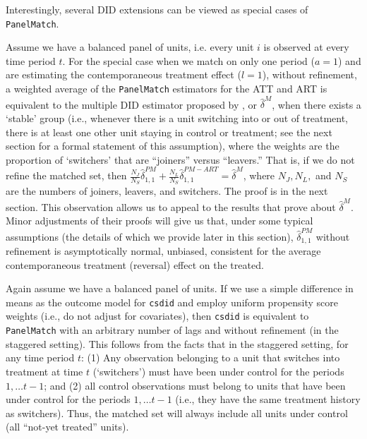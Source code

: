 \documentclass[12pt]{article}
\begin{document}
Interestingly, several DID extensions can be viewed as special cases of \texttt{PanelMatch}.

\begin{rem}
Assume we have a balanced panel of units, i.e. every unit $i$ is observed at every time period $t$. 
For the special case when we match on only one period ($a=1$) and are estimating the contemporaneous treatment effect ($l=1$), without refinement, a weighted average of the \texttt{PanelMatch} estimators for the ATT and ART is equivalent to the multiple DID estimator proposed by \citet{CDH2020}, or $\hat\delta^M$, when there exists a `stable' group (i.e., whenever there is a unit switching into or out of treatment, there is at least one other unit staying in control or treatment; see the next section for a formal statement of this assumption), where the weights are the proportion of `switchers' that are ``joiners'' versus ``leavers.'' That is, if we do not refine the matched set, then $\frac{N_J}{N_S}\hat\delta^{PM}_{1,1}+\frac{N_L}{N_S}\hat\delta^{PM-ART}_{1,1}=\hat\delta^M$, where $N_J,N_L,$ and $N_S$ are the numbers of joiners, leavers, and switchers. 
The proof is in the next section. 
This observation allows us to appeal to the results that \citet{CDH2020} prove about $\hat\delta^M$. Minor adjustments of their proofs will give us that, under some typical assumptions (the details of which we provide later in this section), $\hat\delta_{1,1}^{PM}$ without refinement is asymptotically normal, unbiased, consistent for the average contemporaneous treatment (reversal) effect on the treated.
\end{rem}

\begin{rem}
Again assume we have a balanced panel of units. If we use a simple difference in means as the outcome model for \texttt{csdid} and employ uniform propensity score weights (i.e., do not adjust for covariates), then \texttt{csdid} is equivalent to \texttt{PanelMatch} with an arbitrary number of lags and without refinement (in the staggered setting). This follows from the facts that in the staggered setting, for any time period $t$: (1) Any observation belonging to a unit that switches into treatment at time $t$ (`switchers') must have been under control for the periods $1,\dots t-1$; and (2) 
all control observations must belong to units that have been under control for the periods $1,\dots t-1$ (i.e., they have the same treatment history as switchers). 
Thus, the matched set will always include all units under control (all ``not-yet treated'' units).
\end{rem}
\end{document}
